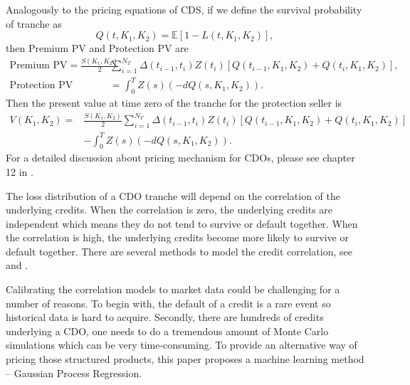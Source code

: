 \documentclass[11pt,a4paper]{article}
\theoremstyle{definition}
\numberwithin{equation}{section}
\begin{document}
	Analogously to the pricing equations of CDS, if we define the survival probability of tranche as 
	\begin{equation}
	Q(t,K_1,K_2)=\mathbb E[1-L(t,K_1,K_2)],
	\end{equation}
	then Premium PV and Protection PV are 
	\begin{equation}
	\begin{split}
	\text{Premium PV} = \frac{S(K_1,K_2)}{2}&\sum_{i=1}^{N_T}\Delta(t_{i-1},t_i)Z(t_i)[Q(t_{i-1},K_1,K_2)+Q(t_{i},K_1,K_2)],\\
	\text{Protection PV} &=\int_{0}^{T}Z(s)(-dQ(s,K_1,K_2)).
	\end{split}
	\end{equation}
	Then the present value at time zero of the tranche 
	for the protection seller is
	\begin{equation}
	\begin{split}
	V(K_1,K_2) =& \frac{S(K_1,K_2)}{2}\sum_{i=1}^{N_T}\Delta(t_{i-1},t_i)Z(t_i)[Q(t_{i-1},K_1,K_2)+Q(t_{i},K_1,K_2)]\\
	&-\int_{0}^{T}Z(s)(-dQ(s,K_1,K_2)).
	\end{split}
	\end{equation}
	For a detailed discussion about pricing mechanism for CDOs,  please see chapter 12 in \cite{okane}. 
	
	The loss distribution of a CDO tranche will depend on the correlation of the underlying credits. When the correlation is zero, the underlying credits are independent which means they do not tend to survive or default together. When the correlation is high, the underlying credits become more likely to survive or default together. There are several methods to model the credit correlation, see \cite{Elouerkhaoui} and \cite[Part II]{okane}.
	
	Calibrating the correlation models to market data could be challenging for a number of reasons. To begin with, the default of a credit is a rare event so historical data is hard to acquire. Secondly, there are hundreds of credits underlying a CDO, one needs to do a tremendous amount of Monte Carlo simulations which can be very time-consuming. To provide an alternative way of pricing those structured products, this paper proposes a machine learning method -- Gaussian Process Regression.
	
\end{document}
